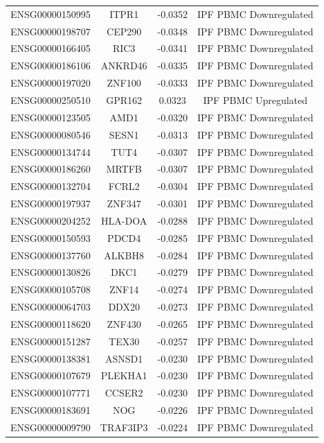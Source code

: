 \documentclass[
]{article}
\begin{document}
\begin{singlespace}
\begin{longtable}[t]{lccc}
ENSG00000150995 & ITPR1 & -0.0352 & IPF PBMC Downregulated\\
ENSG00000198707 & CEP290 & -0.0348 & IPF PBMC Downregulated\\
ENSG00000166405 & RIC3 & -0.0341 & IPF PBMC Downregulated\\
\addlinespace
ENSG00000186106 & ANKRD46 & -0.0335 & IPF PBMC Downregulated\\
ENSG00000197020 & ZNF100 & -0.0333 & IPF PBMC Downregulated\\
ENSG00000250510 & GPR162 & 0.0323 & IPF PBMC Upregulated\\
ENSG00000123505 & AMD1 & -0.0320 & IPF PBMC Downregulated\\
ENSG00000080546 & SESN1 & -0.0313 & IPF PBMC Downregulated\\
\addlinespace
ENSG00000134744 & TUT4 & -0.0307 & IPF PBMC Downregulated\\
ENSG00000186260 & MRTFB & -0.0307 & IPF PBMC Downregulated\\
ENSG00000132704 & FCRL2 & -0.0304 & IPF PBMC Downregulated\\
ENSG00000197937 & ZNF347 & -0.0301 & IPF PBMC Downregulated\\
ENSG00000204252 & HLA-DOA & -0.0288 & IPF PBMC Downregulated\\
\addlinespace
ENSG00000150593 & PDCD4 & -0.0285 & IPF PBMC Downregulated\\
ENSG00000137760 & ALKBH8 & -0.0284 & IPF PBMC Downregulated\\
ENSG00000130826 & DKC1 & -0.0279 & IPF PBMC Downregulated\\
ENSG00000105708 & ZNF14 & -0.0274 & IPF PBMC Downregulated\\
ENSG00000064703 & DDX20 & -0.0273 & IPF PBMC Downregulated\\
\addlinespace
ENSG00000118620 & ZNF430 & -0.0265 & IPF PBMC Downregulated\\
ENSG00000151287 & TEX30 & -0.0257 & IPF PBMC Downregulated\\
ENSG00000138381 & ASNSD1 & -0.0230 & IPF PBMC Downregulated\\
ENSG00000107679 & PLEKHA1 & -0.0230 & IPF PBMC Downregulated\\
ENSG00000107771 & CCSER2 & -0.0230 & IPF PBMC Downregulated\\
\addlinespace
ENSG00000183691 & NOG & -0.0226 & IPF PBMC Downregulated\\
ENSG00000009790 & TRAF3IP3 & -0.0224 & IPF PBMC Downregulated\\

\end{longtable}
\end{singlespace}
\end{document}
